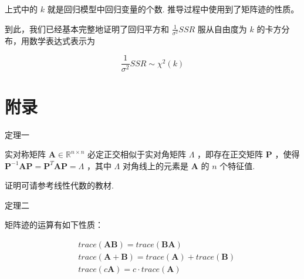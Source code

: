 \documentclass[UTF8]{ctexart}
\begin{document}
    上式中的 $ k $ 就是回归模型中回归变量的个数. 推导过程中使用到了矩阵迹的性质。
    
    到此，我们已经基本完整地证明了回归平方和 $ \frac{1}{\sigma^2} SSR $ 服从自由度为 $ k $ 的卡方分布，用数学表达式表示为
    
    \begin{equation}
    	\frac{1}{\sigma^2} SSR \sim \mathcal{\chi}^2(k)
    \end{equation}


    
    
    

    
    
    
    \section{附录}
    定理一
    
    实对称矩阵 $ \boldsymbol{A} \in \mathbb{R}^{n \times n} $ 必定正交相似于实对角矩阵 $ \boldsymbol{\varLambda} $ ，即存在正交矩阵 $ \boldsymbol{P} $ ，使得 $ \boldsymbol{P}^{-1} \boldsymbol{A} \boldsymbol{P} = \boldsymbol{P}^T \boldsymbol{A} \boldsymbol{P} = \boldsymbol{\varLambda} $ ，其中 $ \boldsymbol{\varLambda} $ 对角线上的元素是 $ \boldsymbol{A} $ 的 $ n $ 个特征值.
    
    证明可请参考线性代数的教材.
    
    定理二
    
    矩阵迹的运算有如下性质：
    
    \begin{equation}\
    	\begin{aligned}
    	    & trace(\boldsymbol{A} \boldsymbol{B}) = trace(\boldsymbol{B} \boldsymbol{A}) \\
    	    & trace(\boldsymbol{A} + \boldsymbol{B}) = trace(\boldsymbol{A}) + trace(\boldsymbol{B}) \\
    	    & trace(c \boldsymbol{A}) = c \cdot trace(\boldsymbol{A})
    	\end{aligned}
    \end{equation}
    
	
	
	
%	
	
\end{document}
